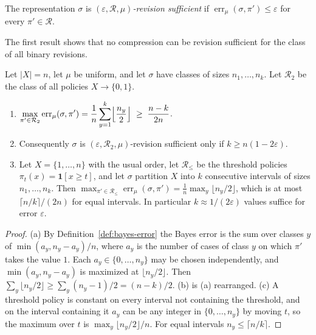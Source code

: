 \begin{definition}
The representation $\sigma$ is \emph{$(\varepsilon,\mathcal R,\mu)$-revision sufficient} if $\operatorname{err}_\mu(\sigma,\pi')\le\varepsilon$ for every $\pi'\in\mathcal R$.
\end{definition}

The first result shows that no compression can be revision sufficient for the class of all binary revisions.

\begin{newresult}\label{thm:worst-revision}
Let $|X|=n$, let $\mu$ be uniform, and let $\sigma$ have classes of sizes $n_1,\dots,n_k$. Let $\mathcal R_2$ be the class of all policies $X\to\{0,1\}$.
\begin{enumerate}[nosep,label=(\alph*)]
  \item $\displaystyle\max_{\pi'\in\mathcal R_2}\operatorname{err}_\mu(\sigma,\pi')=\frac1n\sum_{y=1}^{k}\Bigl\lfloor\frac{n_y}{2}\Bigr\rfloor\;\ge\;\frac{n-k}{2n}$.
  \item Consequently $\sigma$ is $(\varepsilon,\mathcal R_2,\mu)$-revision sufficient only if $k\ge n(1-2\varepsilon)$.
  \item Let $X=\{1,\dots,n\}$ with the usual order, let $\mathcal R_{\le}$ be the threshold policies $\pi_t(x)=\mathbf 1[x\ge t]$, and let $\sigma$ partition $X$ into $k$ consecutive intervals of sizes $n_1,\dots,n_k$. Then $\max_{\pi'\in\mathcal R_\le}\operatorname{err}_\mu(\sigma,\pi')=\frac1n\max_y\lfloor n_y/2\rfloor$, which is at most $\lceil n/k\rceil/(2n)$ for equal intervals. In particular $k\approx1/(2\varepsilon)$ values suffice for error $\varepsilon$.
\end{enumerate}
\end{newresult}
\begin{proof}
(a) By Definition~\ref{def:bayes-error} the Bayes error is the sum over classes $y$ of $\min(a_y,n_y-a_y)/n$, where $a_y$ is the number of cases of class $y$ on which $\pi'$ takes the value $1$. Each $a_y\in\{0,\dots,n_y\}$ may be chosen independently, and $\min(a_y,n_y-a_y)$ is maximized at $\lfloor n_y/2\rfloor$. Then $\sum_y\lfloor n_y/2\rfloor\ge\sum_y(n_y-1)/2=(n-k)/2$. (b) is (a) rearranged. (c) A threshold policy is constant on every interval not containing the threshold, and on the interval containing it $a_y$ can be any integer in $\{0,\dots,n_y\}$ by moving $t$, so the maximum over $t$ is $\max_y\lfloor n_y/2\rfloor/n$. For equal intervals $n_y\le\lceil n/k\rceil$.
\end{proof}

